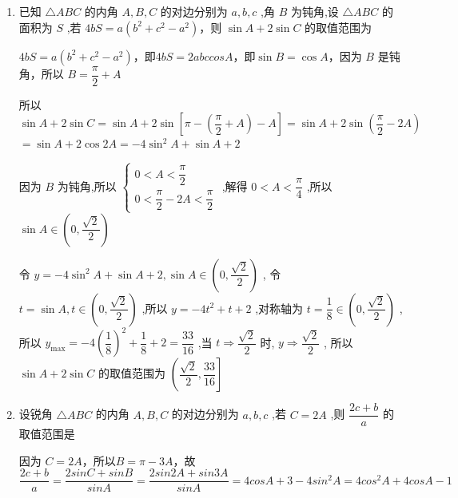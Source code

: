 \begin{enumerate}
    \begin{jieda}
        \begin{enumerate}
            \item $\sqrt{3}tanAtanB - tanA - tanB = \sqrt{3}$即$-\sqrt{3}(1-tanAtanB) = -(tanA + tanB)$，即$\sqrt{3} = -tan(A+B) = tanC$，故$C = \dfrac{\pi}{3}$
            \item 根据正弦定理有$\dfrac{a}{sinA} = \dfrac{b}{sinB} = \dfrac{c}{sinC} = \dfrac{2}{\dfrac{\sqrt{3}}{2}} = \dfrac{4\sqrt{3}}{3}$，因此$a^2+b^2 = \dfrac{16}{3}(sin^2A + sin^2B) = \dfrac{16}{3}(sin^2A + sin^2(\dfrac{2\pi}{3}-A)) = \dfrac{16}{3}(1+\dfrac{1}{2}sin(2A - \dfrac{\pi}{6}))(A \in (\dfrac{\pi}{6}, \dfrac{\pi}{2}))$，因此$a^2+b^2 \in \left(\dfrac{20}{3}, 8 \right]$
        \end{enumerate}        
    \end{jieda}
    \item 已知 $\bigtriangleup {ABC}$ 的内角 $A,B,C$ 的对边分别为 $a,b,c$ ,角 $B$ 为钝角,设 $\bigtriangleup {ABC}$ 的面积为 $S$ ,若 ${4bS} = a\left( {{b}^{2} + {c}^{2} - {a}^{2}}\right)$，则 $\sin A + 2\sin C$ 的取值范围为
    \begin{jieda}
        ${4bS} = a\left( {{b}^{2} + {c}^{2} - {a}^{2}}\right)$，即$4bS = 2abc cosA$，即$\sin B = \cos A$，因为 $B$ 是钝角，所以 $B = \dfrac{\pi }{2} + A$
        
        所以 $\sin A + 2\sin C = \sin A + 2\sin \left\lbrack  {\pi  - \left( {\dfrac{\pi }{2} + A}\right)  - A}\right\rbrack   = \sin A + 2\sin \left( {\dfrac{\pi }{2} - {2A}}\right)$
        $= \sin A + 2\cos {2A} =  - 4{\sin }^{2}A + \sin A + 2$

        因为 $B$ 为钝角,所以 $\left\{  \begin{array}{l} 0 < A < \dfrac{\pi }{2} \\  0 < \dfrac{\pi }{2} - {2A} < \dfrac{\pi }{2} \end{array}\right.$ ,解得 $0 < A < \dfrac{\pi }{4}$ ,所以 $\sin A \in  \left( {0,\dfrac{\sqrt{2}}{2}}\right)$

        令 $y =  - 4{\sin }^{2}A + \sin A + 2,\sin A \in  \left( {0,\dfrac{\sqrt{2}}{2}}\right)$ ,
        令 $t = \sin A,t \in  \left( {0,\dfrac{\sqrt{2}}{2}}\right)$ ,所以 $y =  - 4{t}^{2} + t + 2$ ,对称轴为 $t = \dfrac{1}{8} \in  \left( {0,\dfrac{\sqrt{2}}{2}}\right)$ ,
        所以 ${y}_{\max } =  - 4{\left( \dfrac{1}{8}\right) }^{2} + \dfrac{1}{8} + 2 = \dfrac{33}{16}$ ,当 $t \Longrightarrow  \dfrac{\sqrt{2}}{2}$ 时, $y \Longrightarrow  \dfrac{\sqrt{2}}{2}$ ,
        所以 $\sin A + 2\sin C$ 的取值范围为 $\left( {\dfrac{\sqrt{2}}{2},\dfrac{33}{16}}\right\rbrack$
    \end{jieda}
        \item 设锐角 $\bigtriangleup  {ABC}$ 的内角 $A,B,C$ 的对边分别为 $a,b,c$ ,若 $C = {2A}$ ,则 $\dfrac{{2c} + b}{a}$ 的取值范围是
    \begin{jieda}
        因为 $C = {2A}$，所以$B = \pi -3A$，故$\dfrac{{2c} + b}{a} = \dfrac{2sinC+sinB}{sinA} = \dfrac{2sin2A+sin3A}{sinA} = 4cosA + 3 - 4sin^2A = 4cos^2A + 4cosA - 1$
        

\end{jieda}
\end{enumerate}
